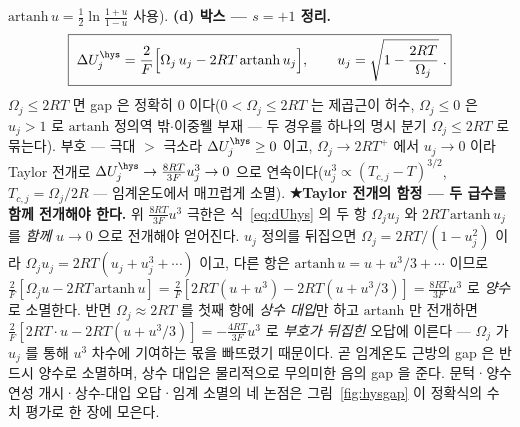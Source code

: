 $\mathrm{artanh}\,u=\tfrac12\ln\tfrac{1+u}{1-u}$ 사용). \textbf{(d) 박스 --- $s=+1$ 정리.}
\begin{equation}
\boxed{\;\Delta U_j^\hys
=\frac{2}{F}\Big[\Omega_j\,u_j-2RT\,\mathrm{artanh}\,u_j\Big],
\qquad u_j=\sqrt{1-\frac{2RT}{\Omega_j}}\;.}
\label{eq:dUhys}
\end{equation}
$\Omega_j\le2RT$ 면 gap 은
정확히 $0$ 이다($0<\Omega_j\le2RT$ 는 제곱근이 허수, $\Omega_j\le0$ 은 $u_j>1$ 로 $\mathrm{artanh}$ 정의역 밖$\cdot$이중웰 부재
--- 두 경우를 하나의 명시 분기 $\Omega_j\le2RT$ 로 묶는다). 부호 --- 극대 $>$ 극소라 $\Delta U_j^\hys\ge0$ 이고, $\Omega_j\to2RT^+$ 에서
$u_j\to0$ 이라 Taylor 전개로 $\Delta U_j^\hys\to\frac{8RT}{3F}u_j^3\to0$ 으로
연속이다($u_j^3\propto(T_{c,j}-T)^{3/2}$, $T_{c,j}=\Omega_j/2R$ --- 임계온도에서 매끄럽게 소멸). \textbf{★Taylor 전개의 함정
--- 두 급수를 함께 전개해야 한다.} 위 $\frac{8RT}{3F}u^3$ 극한은 식~\eqref{eq:dUhys} 의 두 항 $\Omega_ju_j$ 와
$2RT\,\mathrm{artanh}\,u_j$ 를 \emph{함께} $u\to0$ 으로 전개해야 얻어진다. $u_j$ 정의를 뒤집으면
$\Omega_j=2RT/(1-u_j^2)$ 이라 $\Omega_ju_j=2RT(u_j+u_j^3+\cdots)$ 이고, 다른 항은 $\mathrm{artanh}\,u=u+u^3/3+\cdots$ 이므로
$\frac{2}{F}[\Omega_ju-2RT\,\mathrm{artanh}\,u]=\frac{2}{F}[2RT(u+u^3)-2RT(u+u^3/3)]=\frac{8RT}{3F}u^3$ 로 \emph{양수}로 소멸한다.
반면 $\Omega_j\approx2RT$ 를 첫째 항에 \emph{상수 대입}만 하고 $\mathrm{artanh}$ 만 전개하면
$\frac{2}{F}[2RT\cdot u-2RT(u+u^3/3)]=-\frac{4RT}{3F}u^3$ 로 \emph{부호가 뒤집힌} 오답에 이른다 --- $\Omega_j$ 가
$u_j$ 를 통해 $u^3$ 차수에 기여하는 몫을 빠뜨렸기 때문이다. 곧 임계온도 근방의 gap 은 반드시 양수로 소멸하며,
상수 대입은 물리적으로 무의미한 음의 gap 을 준다. 문턱·양수 연성 개시·상수-대입 오답·임계 소멸의 네 논점은
그림~\ref{fig:hysgap} 이 정확식의 수치 평가로 한 장에 모은다.

